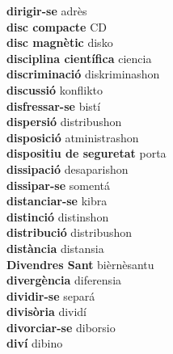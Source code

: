 \textbf{ dirigir-se  } adrès \\
\textbf{ disc compacte  } CD \\
\textbf{ disc magnètic  } disko \\
\textbf{ disciplina científica  } ciencia \\
\textbf{ discriminació  } diskriminashon \\
\textbf{ discussió  } konflikto \\
\textbf{ disfressar-se  } bistí \\
\textbf{ dispersió  } distribushon \\
\textbf{ disposició  } atministrashon \\
\textbf{ dispositiu de seguretat  } porta \\
\textbf{ dissipació  } desaparishon \\
\textbf{ dissipar-se  } somentá \\
\textbf{ distanciar-se  } kibra \\
\textbf{ distinció  } distinshon \\
\textbf{ distribució  } distribushon \\
\textbf{ distància  } distansia \\
\textbf{ Divendres Sant  } bièrnèsantu \\
\textbf{ divergència  } diferensia \\
\textbf{ dividir-se  } separá \\
\textbf{ divisòria  } dividí \\
\textbf{ divorciar-se  } diborsio \\
\textbf{ diví  } dibino \\
